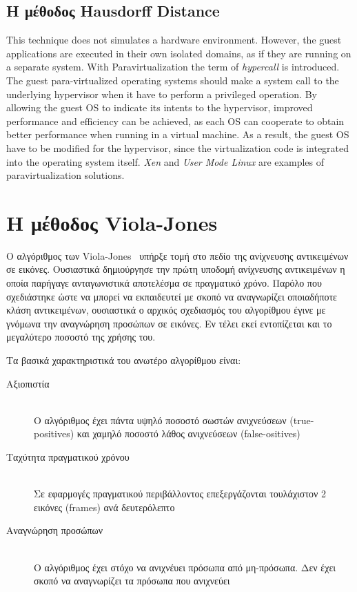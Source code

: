 \subsection{H μέθοδος Hausdorff Distance}

This technique does not simulates a hardware environment. However, the guest
applications are executed in their own isolated domains, as if they are running
on a separate system. With Paravirtualization the term of \emph{hypercall} is
introduced. The guest para-virtualized operating systems should make a system
call to the underlying hypervisor when it have to perform a privileged
operation. By allowing the guest OS to indicate its intents to the hypervisor,
improved performance and efficiency can be achieved, as each OS can cooperate to
obtain better performance when running in a virtual machine. As a result, the
guest OS have to be modified for the hypervisor, since the virtualization code
is integrated into the operating system itself. \emph{Xen} and \emph{User Mode
Linux} are examples of paravirtualization solutions.

\section{H μέθοδος Viola-Jones}\label{sec:violjon}

O αλγόριθμος των Viola-Jones~\cite{Viola01rapidobject} υπήρξε τομή στο πεδίο
της ανίχνευσης αντικειμένων σε εικόνες. Ουσιαστικά δημιούργησε την πρώτη
υποδομή ανίχνευσης αντικειμένων η οποία παρήγαγε ανταγωνιστικά αποτελέσμα σε
πραγματικό χρόνο. Παρόλο που σχεδιάστηκε ώστε να μπορεί να εκπαιδευτεί με σκοπό
να αναγνωρίζει οποιαδήποτε κλάση αντικειμένων, ουσιαστικά ο αρχικός σχεδιασμός
του αλγορίθμου έγινε με γνόμωνα την αναγνώρηση προσώπων σε εικόνες. Εν τέλει
εκεί εντοπίζεται και το μεγαλύτερο ποσοστό της χρήσης του.

Τα βασικά χαρακτηριστικά του ανωτέρο αλγορίθμου είναι:
\begin{description}
  \item[Αξιοπιστία] \hfill \\
      Ο αλγόριθμος έχει πάντα υψηλό ποσοστό σωστών ανιχνεύσεων (true-positives)
        και χαμηλό ποσοστό λάθος ανιχνεύσεων (false-ositives)
  \item[Ταχύτητα πραγματικού χρόνου] \hfill \\
      Σε εφαρμογές πραγματικού περιβάλλοντος επεξεργάζονται τουλάχιστον 2 εικόνες
        (frames) ανά δευτερόλεπτο
  \item[Αναγνώρηση προσώπων] \hfill \\
      Ο αλγόριθμος έχει στόχο να ανιχνέυει πρόσωπα από μη-πρόσωπα. Δεν έχει
        σκοπό να αναγνωρίζει τα πρόσωπα που ανιχνεύει
\end{description}

